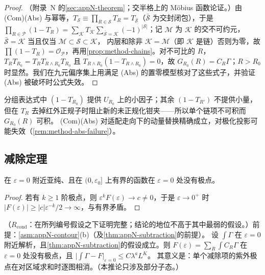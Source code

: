 \begin{proof}
（附录~N 的\cref{sec:appN-theorem}；交半格上的 Möbius 函数论证。）由 (Com)(Abs) 与幂等，$T_{\mathcal S}\equiv\prod_{R\in\mathcal S}T_R=T_{\bar{\mathcal S}}$（$\bar{\mathcal S}$ 为交封闭包），于是
$\prod_{R\in\mathcal P}(1-T_R)=\sum_{\mathcal K}T_{\mathcal K}\sum_{\bar{\mathcal S}=\mathcal K}(-1)^{|\mathcal S|}$；记 $\mathcal M$ 为 $\mathcal K$ 的交不可约元，$\bar{\mathcal S}=\mathcal K$ 当且仅当 $\mathcal M\subset\mathcal S\subset\mathcal K$，
内层和除非 $\mathcal K=\mathcal M$（即 $\mathcal K$ 是链）否则为零，故 $\prod(1-T_R)=\mathcal O_{\mathcal P}$，再用\cref{prop:method-chains}。对不可比的 $R$，$T_RT_{R_0}=T_RT_{R\wedge R_0}T_{R_0}$ 且
$T_{R\wedge R_0}(1-T_{R\wedge R_0})=0$，故 $G_{R_0}(R)=C_R\Gamma$；$R>R_0$ 时显然。我们在九元偏序集上用满足 (Abs) 的置零模型核对了这些式子，并验证 (Abs) 被破坏时公式失效。%
\end{proof}

分组表达式中 $(1-T_{R_0})$ 提供 $U_{R_0}$ 上的小因子；其余 $(1-T_{R'})$ 不提供小量，但在 $T_R$ 去掉红外正规子时阻止新的未正规化钳夹——所以单个链项不可积而 $G_{R_0}(R)$ 可积。
(Com)(Abs) 对适配走向下的动量替换精确成立，对极化投影可能失效（\cref{rem:method-abs-failure}）。

\subsection{减除定理}

\begin{lemma}[有界的亚纯函数无极点]\label{lem:method-no-pole}
在 $\varepsilon=0$ 附近亚纯、且在 $(0,\varepsilon_0]$ 上有界的函数在 $\varepsilon=0$ 处没有极点。
\end{lemma}

\begin{proof}
若有 $k\ge1$ 阶极点，则 $\varepsilon^kF(\varepsilon)\to c\neq0$，于是 $\varepsilon\to0^+$ 时 $|F(\varepsilon)|\ge|c|\varepsilon^{-k}/2\to\infty$，与有界矛盾。
\end{proof}

\begin{corollary}\label{cor:method-removing-eps}
（$R_{\mathrm{cond}}$：在所列编号假设之下证明完整；结论的地位不高于其中最弱的假设。）前提：\cref{asm:appN-contour}(b)（及\cref{thm:appN-subtraction}的前提）。
设 $\int\Gamma$ 在 $\varepsilon=0$ 附近解析，且\cref{thm:appN-subtraction}的假设成立。则 $F(\varepsilon)=\sum_R\int C_R\Gamma$ 在 $\varepsilon=0$ 处没有极点，且 $\bigl|\int\Gamma-F\bigr|_{\varepsilon=0}\le C\lambda^aL^K$。
其意义是：单个减除项的紫外极点在对区域求和时逐图相消。（本推论只涉及部分子态。）
\end{corollary}

